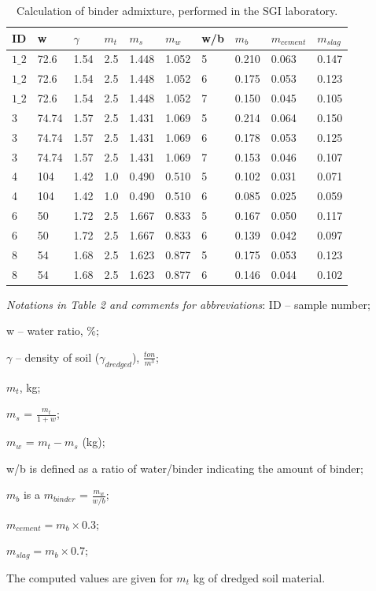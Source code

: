 \documentclass[sustainability,article,submit,pdftex,moreauthors]{Definitions/mdpi}
\begin{document}
\begin{table}[H] 
\begin{threeparttable}
\caption{Calculation of binder admixture, performed in the SGI laboratory.\label{tab02}}
\begin{tabularx}{\textwidth}{CCCCCCCCCC}
\toprule
\textbf{ID} & \textbf{w} & \textbf{$\gamma$} & \textbf{$m_t$} & \textbf{$m_s$} & \textbf{$m_w$} & \textbf{w/b} & \textbf{$m_b$} & \textbf{$m_{cement}$} & \textbf{$m_{slag}$} \\
\midrule
$1\_2$ & 72.6 & 1.54 & 2.5 & 1.448 & 1.052 & 5 & 0.210 & 0.063 & 0.147\\
$1\_2$ & 72.6 & 1.54 & 2.5 & 1.448 & 1.052 & 6 & 0.175 & 0.053 & 0.123\\
$1\_2$ & 72.6 & 1.54 & 2.5 & 1.448 & 1.052 & 7 & 0.150 & 0.045 & 0.105\\
3 & 74.74 & 1.57 & 2.5 & 1.431 & 1.069 & 5 & 0.214 & 0.064 & 0.150\\
3 & 74.74 & 1.57 & 2.5 & 1.431 & 1.069 & 6 & 0.178 & 0.053 & 0.125\\
3 & 74.74 & 1.57 & 2.5 & 1.431 & 1.069 & 7 & 0.153 & 0.046 & 0.107\\
4 & 104 & 1.42 & 1.0 & 0.490 & 0.510 & 5 & 0.102 & 0.031 & 0.071\\
4 & 104 & 1.42 & 1.0 & 0.490 & 0.510 & 6 & 0.085 & 0.025 & 0.059\\
6 & 50 & 1.72 & 2.5 & 1.667 & 0.833 & 5 & 0.167 & 0.050 & 0.117\\
6 & 50 & 1.72 & 2.5 & 1.667 & 0.833 & 6 & 0.139 & 0.042 & 0.097\\
8 & 54 & 1.68 & 2.5 & 1.623 & 0.877 & 5 & 0.175 & 0.053 & 0.123\\
8 & 54 & 1.68 & 2.5 & 1.623 & 0.877 & 6 & 0.146 & 0.044 & 0.102\\
\bottomrule
\end{tabularx}
\begin{tablenotes}
      	\item \emph{Notations in Table 2 and comments for abbreviations}: ID -- sample number; 
	\item w -- water ratio, \%; 
	\item $\gamma$ -- density of soil ($\gamma_{dredged}$), $\frac{ton}{m^3}$; 
	\item $m_t$, kg; 
	\item $m_s$ = $\frac{m_t}{1+w}$; 
	\item $m_w$ = $m_t - m_s$ (kg);
	\item w/b is defined as a ratio of water/binder indicating the amount of binder;
	\item $m_b$ is a $m_{binder}$ = $\frac{m_w}{w/b}$;
	\item $m_{cement} = {m_b}\times 0.3$;
	\item $m_{slag} = {m_b}\times 0.7$;
	\item The computed values are given for $m_t$ kg of dredged soil material.
    \end{tablenotes}
  \end{threeparttable}
\end{table}
\end{document}
